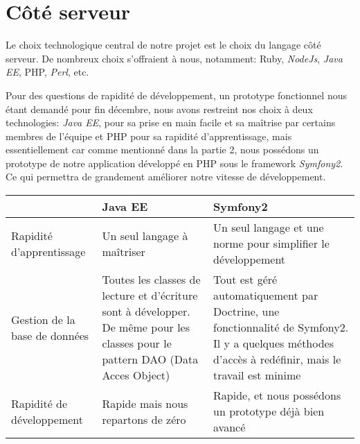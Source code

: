 \section{Côté serveur}
Le choix technologique central de notre projet est le choix du langage côté serveur. De nombreux choix s'offraient à nous, notamment: Ruby, \textit{NodeJs}, \textit{Java EE}, PHP, \textit{Perl}, etc.

Pour des questions de rapidité de développement, un prototype fonctionnel nous étant demandé pour fin décembre, nous avons restreint nos choix à deux technologies: \textit{Java EE}, pour sa prise en main facile et sa maîtrise par certains membres de l'équipe et PHP pour sa rapidité d'apprentissage, mais essentiellement car comme mentionné dans la partie 2, nous possédons un prototype de notre application développé en PHP sous le framework \textit{Symfony2}. Ce qui permettra de grandement améliorer notre vitesse de développement.\\


\begin{tabular}{|m{125pt}|m{150pt}|m{150pt}|}
	\hline
	\null & \textbf{Java EE} & \textbf{Symfony2} \\
	\hline
	Rapidité d'apprentissage & Un  seul langage à maîtriser & Un seul langage et une norme pour simplifier le développement\\
	\hline
	Gestion de la base de données & Toutes les classes de lecture et d'écriture sont à développer. De même pour les classes pour le pattern DAO (Data Acces Object) & Tout est géré automatiquement par Doctrine, une fonctionnalité de Symfony2. Il y a quelques méthodes d'accès à redéfinir, mais le travail est minime\\
	\hline
	Rapidité de développement & Rapide mais nous repartons de zéro & Rapide, et nous possédons un prototype déjà bien avancé\\
	\hline
\end{tabular} \vspace*{5mm}
%                       
% 
%
%
%
%  
%
%

